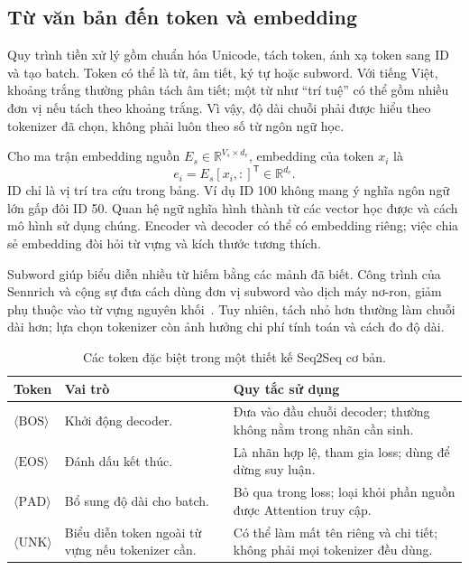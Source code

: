 \documentclass[11pt,a4paper]{article}
\numberwithin{equation}{section}
\newcommand{\R}{\mathbb{R}}
\newcommand{\BOS}{\langle\mathrm{BOS}\rangle}
\newcommand{\EOS}{\langle\mathrm{EOS}\rangle}
\newcommand{\PAD}{\langle\mathrm{PAD}\rangle}
\newcommand{\UNK}{\langle\mathrm{UNK}\rangle}
\begin{document}
\subsection{Từ văn bản đến token và embedding}
Quy trình tiền xử lý gồm chuẩn hóa Unicode, tách token, ánh xạ token sang ID và tạo batch. Token có thể là từ, âm tiết, ký tự hoặc subword. Với tiếng Việt, khoảng trắng thường phân tách âm tiết; một từ như ``trí tuệ'' có thể gồm nhiều đơn vị nếu tách theo khoảng trắng. Vì vậy, độ dài chuỗi phải được hiểu theo tokenizer đã chọn, không phải luôn theo số từ ngôn ngữ học.

Cho ma trận embedding nguồn $E_s\in\R^{V_s\times d_e}$, embedding của token $x_i$ là
\begin{equation}
e_i=E_s[x_i,:]^{\mathsf T}\in\R^{d_e}.
\end{equation}
ID chỉ là vị trí tra cứu trong bảng. Ví dụ ID 100 không mang ý nghĩa ngôn ngữ lớn gấp đôi ID 50. Quan hệ ngữ nghĩa hình thành từ các vector học được và cách mô hình sử dụng chúng. Encoder và decoder có thể có embedding riêng; việc chia sẻ embedding đòi hỏi từ vựng và kích thước tương thích.

Subword giúp biểu diễn nhiều từ hiếm bằng các mảnh đã biết. Công trình của Sennrich và cộng sự đưa cách dùng đơn vị subword vào dịch máy nơ-ron, giảm phụ thuộc vào từ vựng nguyên khối~\cite{subword}. Tuy nhiên, tách nhỏ hơn thường làm chuỗi dài hơn; lựa chọn tokenizer còn ảnh hưởng chi phí tính toán và cách đo độ dài.

\begin{table}[H]
\centering\small
\begin{tabularx}{\linewidth}{@{}p{2.4cm}YY@{}}
\toprule{}Token & Vai trò & Quy tắc sử dụng\\\midrule
$\BOS$ & Khởi động decoder. & Đưa vào đầu chuỗi decoder; thường không nằm trong nhãn cần sinh.\\
$\EOS$ & Đánh dấu kết thúc. & Là nhãn hợp lệ, tham gia loss; dùng để dừng suy luận.\\
$\PAD$ & Bổ sung độ dài cho batch. & Bỏ qua trong loss; loại khỏi phần nguồn được Attention truy cập.\\
$\UNK$ & Biểu diễn token ngoài từ vựng nếu tokenizer cần. & Có thể làm mất tên riêng và chi tiết; không phải mọi tokenizer đều dùng.\\
\bottomrule
\end{tabularx}
\caption{Các token đặc biệt trong một thiết kế Seq2Seq cơ bản.}
\end{table}
\end{document}
